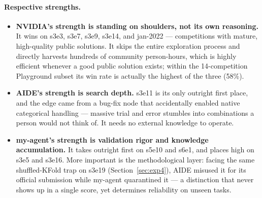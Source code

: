 \documentclass[11pt,a4paper]{article}
\begin{document}
\paragraph{Respective strengths.}
\begin{itemize}[leftmargin=*]
\item \textbf{NVIDIA's strength is standing on shoulders, not its own reasoning.} It wins on s3e3, s3e7, s3e9, s3e14, and jan-2022 --- competitions with mature, high-quality public solutions. It skips the entire exploration process and directly harvests hundreds of community person-hours, which is highly efficient whenever a good public solution exists; within the 14-competition Playground subset its win rate is actually the highest of the three (58\%).
\item \textbf{AIDE's strength is search depth.} s3e11 is its only outright first place, and the edge came from a bug-fix node that accidentally enabled native categorical handling --- massive trial and error stumbles into combinations a person would not think of. It needs no external knowledge to operate.
\item \textbf{my-agent's strength is validation rigor and knowledge accumulation.} It takes outright first on s5e10 and s6e1, and places high on s3e5 and s3e16. More important is the methodological layer: facing the same shuffled-KFold trap on s3e19 (Section~\ref{sec:exp4}), AIDE misused it for its official submission while my-agent quarantined it --- a distinction that never shows up in a single score, yet determines reliability on unseen tasks.
\end{itemize}
\end{document}
